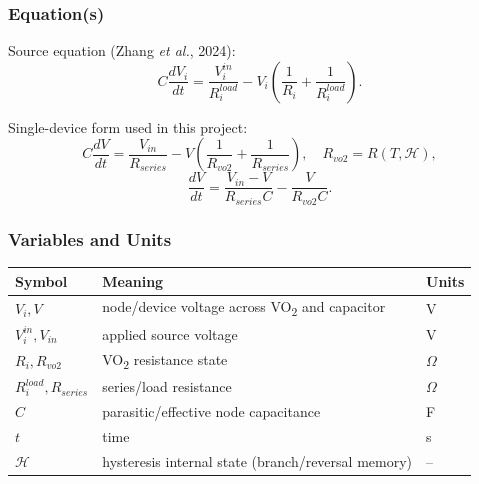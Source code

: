 \documentclass[11pt]{article}
\begin{document}
\subsubsection*{Equation(s)}
Source equation (Zhang \emph{et al.}, 2024):
\begin{equation}
C\frac{dV_i}{dt}=\frac{V^{in}_i}{R^{load}_i}-V_i\left(\frac{1}{R_i}+\frac{1}{R^{load}_i}\right).
\label{eq:intro_current_original}
\end{equation}

Single-device form used in this project:
\begin{equation}
C\frac{dV}{dt}=\frac{V_{in}}{R_{series}}-V\left(\frac{1}{R_{vo2}}+\frac{1}{R_{series}}\right),
\quad R_{vo2}=R(T,\mathcal{H}),
\label{eq:intro_current_single}
\end{equation}
\begin{equation}
\frac{dV}{dt}=\frac{V_{in}-V}{R_{series}C}-\frac{V}{R_{vo2}C}.
\label{eq:intro_current_single_rearranged}
\end{equation}

\subsubsection*{Variables and Units}
\begin{center}
\begin{tabular}{lll}
\toprule
Symbol & Meaning & Units \\
\midrule
\(V_i, V\) & node/device voltage across VO\textsubscript{2} and capacitor & V \\
\(V^{in}_i, V_{in}\) & applied source voltage & V \\
\(R_i, R_{vo2}\) & VO\textsubscript{2} resistance state & \(\Omega\) \\
\(R^{load}_i, R_{series}\) & series/load resistance & \(\Omega\) \\
\(C\) & parasitic/effective node capacitance & F \\
\(t\) & time & s \\
\(\mathcal{H}\) & hysteresis internal state (branch/reversal memory) & -- \\
\bottomrule
\end{tabular}
\end{center}
\end{document}
